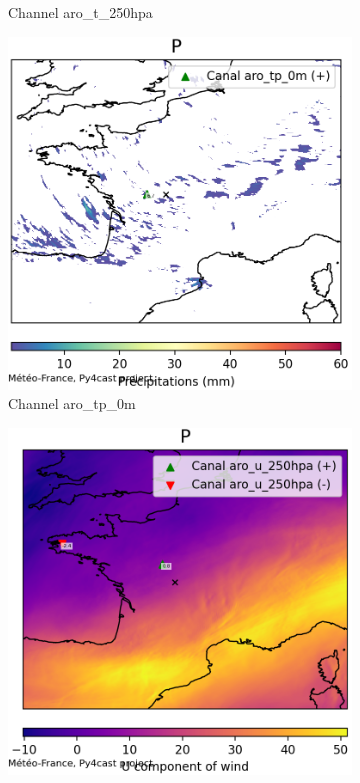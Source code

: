 \begin{figure}[h]
\begin{subfigure}[b]{0.44\textwidth}
        \caption{Channel aro\_t\_250hpa}
    \end{subfigure}
    \hfill
    \begin{subfigure}[b]{0.44\textwidth}
        \includegraphics[width=\textwidth]{Images/titan_rain_anchors/nov-21/complete/2023112100_feature_aro_tp_0m.png}
        \caption{Channel aro\_tp\_0m}
    \end{subfigure}
    \hfill
    \begin{subfigure}[b]{0.44\textwidth}
        \includegraphics[width=\textwidth]{Images/titan_rain_anchors/nov-21/complete/2023112100_feature_aro_u_250hpa.png}

\end{subfigure}
\end{figure}
